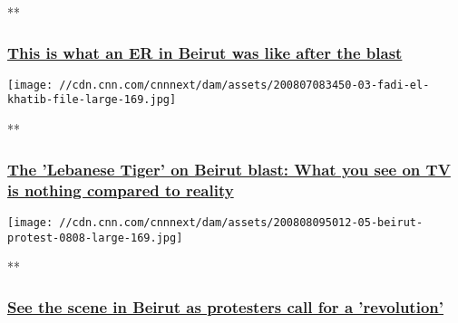 **

\hypertarget{this-is-what-an-er-in-beirut-was-like-after-the-blast-1}{%
\subsubsection{\texorpdfstring{\href{/videos/world/2020/08/07/beirut-lebanon-explosion-hospital-icu-wedeman-pkg-intl-ldn-vpx.cnn}{This
is what an ER in Beirut was like after the
blast}}{This is what an ER in Beirut was like after the blast}}\label{this-is-what-an-er-in-beirut-was-like-after-the-blast-1}}

\href{/videos/sports/2020/08/07/fadi-el-khatib-basketball-hero-lebanon-beirut-explosion-charity-spt-intl-lon-orig.cnn/video/playlists/around-the-world/}{}

\texttt{[image: //cdn.cnn.com/cnnnext/dam/assets/200807083450-03-fadi-el-khatib-file-large-169.jpg]}

**

\hypertarget{the-lebanese-tiger-on-beirut-blast-what-you-see-on-tv-is-nothing-compared-to-reality}{%
\subsubsection{\texorpdfstring{\href{/videos/sports/2020/08/07/fadi-el-khatib-basketball-hero-lebanon-beirut-explosion-charity-spt-intl-lon-orig.cnn/video/playlists/around-the-world/}{The
'Lebanese Tiger' on Beirut blast: What you see on TV is nothing compared
to
reality}}{The 'Lebanese Tiger' on Beirut blast: What you see on TV is nothing compared to reality}}\label{the-lebanese-tiger-on-beirut-blast-what-you-see-on-tv-is-nothing-compared-to-reality}}

\href{/videos/world/2020/08/08/protesters-in-beirut-wedeman-vpx.cnn/video/playlists/around-the-world/}{}

\texttt{[image: //cdn.cnn.com/cnnnext/dam/assets/200808095012-05-beirut-protest-0808-large-169.jpg]}

**

\hypertarget{see-the-scene-in-beirut-as-protesters-call-for-a-revolution-}{%
\subsubsection{\texorpdfstring{\href{/videos/world/2020/08/08/protesters-in-beirut-wedeman-vpx.cnn/video/playlists/around-the-world/}{See
the scene in Beirut as protesters call for a 'revolution'
}}{See the scene in Beirut as protesters call for a 'revolution' }}\label{see-the-scene-in-beirut-as-protesters-call-for-a-revolution-}}

